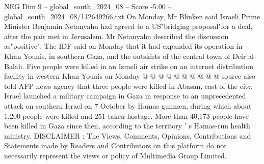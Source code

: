 \begin{textsample}{NEG Dim 9 – global\_south\_2024\_08 – Score -5.00 – global\_south\_2024\_08/112649266.txt}
On Monday, Mr Blinken said Israeli Prime Minister Benjamin Netanyahu had agreed to a US"bridging proposal"for a deal, after the pair met in Jerusalem.
Mr Netanyahu described the discussion as"positive".
The IDF said on Monday that it had expanded its operation in Khan Younis, in southern Gaza, and the outskirts of the central town of Deir al-Balah.
Five people were killed in an Israeli air strike on an internet distribution facility in western Khan Younis on Monday @ @ @ @ @ @ @ @ @ @ source also told AFP news agency that three people were killed in Abasan, east of the city.
Israel launched a military campaign in Gaza in response to an unprecedented attack on southern Israel on 7 October by Hamas gunmen, during which about 1,200 people were killed and 251 taken hostage.
More than 40,173 people have been killed in Gaza since then, according to the territory ' s Hamas-run health ministry.
DISCLAIMER : The Views, Comments, Opinions, Contributions and Statements made by Readers and Contributors on this platform do not necessarily represent the views or policy of Multimedia Group Limited.

\end{textsample}
